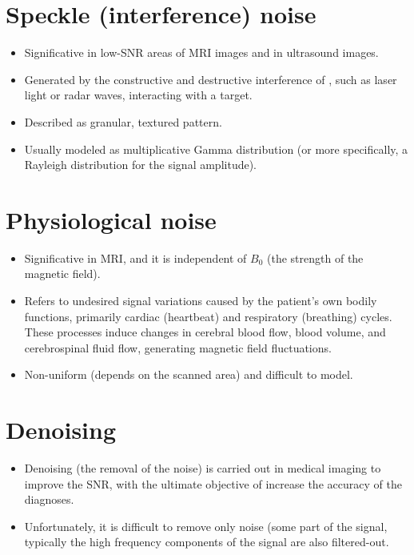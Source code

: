 \section{Speckle (interference) noise}
\begin{itemize}
\item Significative in low-SNR areas of \gls{MRI} images and in ultrasound images.
\item Generated by the constructive and destructive interference of
  , such as laser light or
  radar waves, interacting with a target.
\item Described as granular, textured pattern.
\item Usually modeled as multiplicative Gamma distribution (or more
  specifically, a Rayleigh distribution
  \cite{wikipedia_Rayleigh_distribution} for the signal amplitude).
\end{itemize}

\section{Physiological noise \cite{scarciglia2023physiological}}
\begin{itemize}
\item Significative in \gls{MRI}, and it is independent of $B_0$ (the
  strength of the magnetic field).
\item Refers to undesired signal variations caused by the patient's
  own bodily functions, primarily cardiac (heartbeat) and respiratory
  (breathing) cycles. These processes induce changes in cerebral blood
  flow, blood volume, and cerebrospinal fluid flow, generating
  magnetic field fluctuations.
\item Non-uniform (depends on the scanned area) and difficult to model.
\end{itemize}

\section{Denoising \cite{buades2005review}}
\begin{itemize}
\item Denoising (the removal of the noise) is carried out in
  medical imaging to improve the \gls{SNR}, with the ultimate
  objective of increase the accuracy of the diagnoses.
\item Unfortunately, it is difficult to remove only noise (some part
  of the signal, typically the high frequency components of the signal
  are also filtered-out.
\end{itemize}


